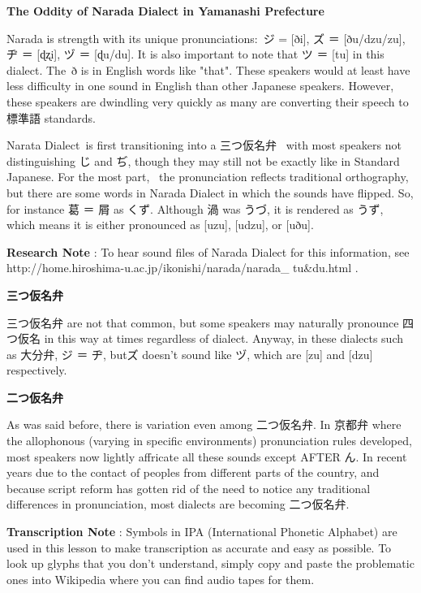 \begin{center}
 \textbf{The Oddity of Narada Dialect in Yamanashi Prefecture }
\end{center}

\par{ Narada is strength with its unique pronunciations: ジ = [ði], ズ ＝ [ðu\slash dzu\slash zu], ヂ ＝ [ɖʐi], ヅ ＝ [ɖu\slash du]. It is also important to note that ツ ＝ [tu] in this dialect. The ð is in English words like "that". These speakers would at least have less difficulty in one sound in English than other Japanese speakers. However, these speakers are dwindling very quickly as many are converting their speech to 標準語 standards. }

\par{ Narata Dialect is first transitioning into a 三つ仮名弁  with most speakers not distinguishing じ and ぢ, though they may still not be exactly like in Standard Japanese. For the most part,  the pronunciation reflects traditional orthography, but there are some words in Narada Dialect in which the sounds have flipped. So, for instance 葛 ＝ 屑 as くず. Although 渦 was うづ, it is rendered as うず, which means it is either pronounced as [uzu], [udzu], or [uðu].  }

\par{\textbf{Research Note }: To hear sound files of Narada Dialect for this information, see http:\slash \slash home.hiroshima-u.ac.jp\slash ikonishi\slash narada\slash narada\_ tu\&du.html  . }

\begin{center}
 \textbf{三つ仮名弁 }
\end{center}

\par{ 三つ仮名弁 are not that common, but some speakers may naturally pronounce 四つ仮名 in this way at times regardless of dialect. Anyway, in these dialects such as 大分弁, ジ ＝ ヂ, butズ doesn't sound like ヅ, which are [zu] and [dzu] respectively. }

\begin{center}
 \textbf{二つ仮名弁 }
\end{center}

\par{ As was said before, there is variation even among 二つ仮名弁. In 京都弁 where the allophonous (varying in specific environments) pronunciation rules developed, most speakers now lightly affricate all these sounds except AFTER ん. In recent years due to the contact of peoples from different parts of the country, and because script reform has gotten rid of the need to notice any traditional differences in pronunciation, most dialects are becoming 二つ仮名弁. }

\par{\textbf{Transcription Note }: Symbols in IPA (International Phonetic Alphabet) are used in this lesson to make transcription as accurate and easy as possible. To look up glyphs that you don't understand, simply copy and paste the problematic ones into Wikipedia where you can find audio tapes for them. }
    